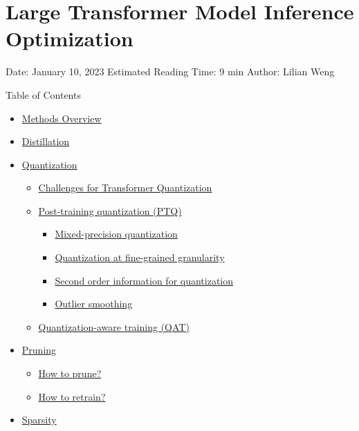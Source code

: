 \section{Large Transformer Model Inference Optimization}\label{large-transformer-model-inference-optimization}

Date: January 10, 2023 \textbar{} Estimated Reading Time: 9 min \textbar{} Author: Lilian Weng

{Table of Contents}

\begin{itemize}
\tightlist
\item
  \hyperref[methods-overview]{Methods Overview}
\item
  \hyperref[distillation]{Distillation}
\item
  \hyperref[quantization]{Quantization}

  \begin{itemize}
  \tightlist
  \item
    \hyperref[challenges-for-transformer-quantization]{Challenges for Transformer Quantization}
  \item
    \hyperref[post-training-quantization-ptq]{Post-training quantization (PTQ)}

    \begin{itemize}
    \tightlist
    \item
      \hyperref[mixed-precision-quantization]{Mixed-precision quantization}
    \item
      \hyperref[quantization-at-fine-grained-granularity]{Quantization at fine-grained granularity}
    \item
      \hyperref[second-order-information-for-quantization]{Second order information for quantization}
    \item
      \hyperref[outlier-smoothing]{Outlier smoothing}
    \end{itemize}
  \item
    \hyperref[quantization-aware-training-qat]{Quantization-aware training (QAT)}
  \end{itemize}
\item
  \hyperref[pruning]{Pruning}

  \begin{itemize}
  \tightlist
  \item
    \hyperref[how-to-prune]{How to prune?}
  \item
    \hyperref[how-to-retrain]{How to retrain?}
  \end{itemize}
\item
  \hyperref[sparsity]{Sparsity}


\end{itemize}
